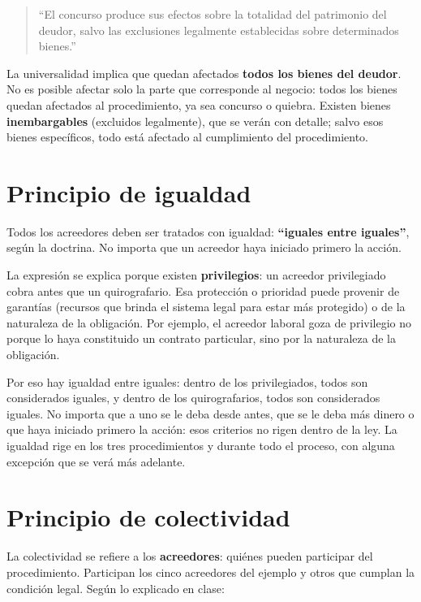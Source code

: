 \documentclass[12pt,oneside]{book}
\begin{document}
\begin{quote}
``El concurso produce sus efectos sobre la totalidad del patrimonio del deudor, salvo las exclusiones legalmente establecidas sobre determinados bienes.''
\end{quote}

La universalidad implica que quedan afectados \textbf{todos los bienes del deudor}. No es posible afectar solo la parte que corresponde al negocio: todos los bienes quedan afectados al procedimiento, ya sea concurso o quiebra. Existen bienes \textbf{inembargables} (excluidos legalmente), que se verán con detalle; salvo esos bienes específicos, todo está afectado al cumplimiento del procedimiento.

\section{Principio de igualdad}

Todos los acreedores deben ser tratados con igualdad: \textbf{``iguales entre iguales''}, según la doctrina. No importa que un acreedor haya iniciado primero la acción.

La expresión se explica porque existen \textbf{privilegios}: un acreedor privilegiado cobra antes que un quirografario. Esa protección o prioridad puede provenir de garantías (recursos que brinda el sistema legal para estar más protegido) o de la naturaleza de la obligación. Por ejemplo, el acreedor laboral goza de privilegio no porque lo haya constituido un contrato particular, sino por la naturaleza de la obligación.

Por eso hay igualdad entre iguales: dentro de los privilegiados, todos son considerados iguales, y dentro de los quirografarios, todos son considerados iguales. No importa que a uno se le deba desde antes, que se le deba más dinero o que haya iniciado primero la acción: esos criterios no rigen dentro de la ley. La igualdad rige en los tres procedimientos y durante todo el proceso, con alguna excepción que se verá más adelante.

\section{Principio de colectividad}

La colectividad se refiere a los \textbf{acreedores}: quiénes pueden participar del procedimiento. Participan los cinco acreedores del ejemplo y otros que cumplan la condición legal. Según lo explicado en clase:
\end{document}
